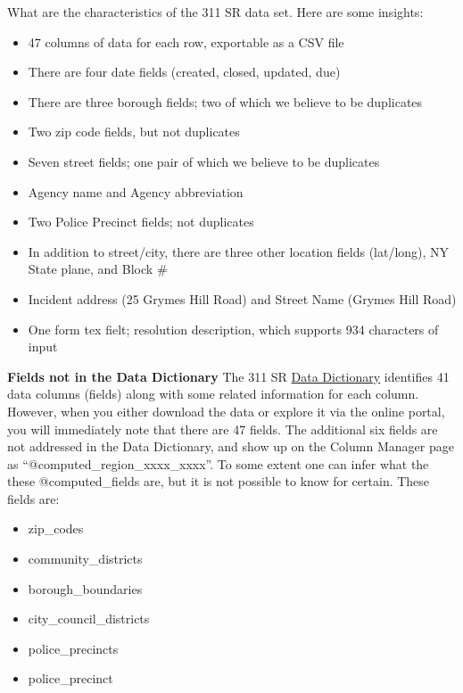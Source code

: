 \documentclass[12pt, titlepage]{article}
\begin{document}
What are the characteristics of the 311 SR data set. Here are some insights:

\begin{itemize}
	\item 47 columns of data for each row, exportable as a CSV file
	\item There are four date fields (created, closed, updated, due)
	\item There are three borough fields; two of which we believe to be duplicates
	\item Two zip code fields, but not duplicates
	\item Seven street fields; one pair of which we believe to be duplicates
	\item Agency name and Agency abbreviation
	\item Two Police Precinct fields; not duplicates
	\item In addition to street/city, there are three other location fields (lat/long), NY State plane, and Block \#
	\item Incident address (25 Grymes Hill Road) and Street Name (Grymes Hill Road)
	\item One form tex fielt; resolution description, which supports 934 characters of input
\end{itemize}


\textbf{Fields not in the Data Dictionary} The 311 SR \href{https://data.cityofnewyork.us/api/views/erm2-nwe9/files/b372b884-f86a-453b-ba16-1fe06ce9d212?download=true&filename=311_ServiceRequest_2010-Present_DataDictionary_Updated_2023.xlsx}{Data Dictionary}
 identifies 41 data columns (fields) along with some
related information for each column. However, when you either download the data or explore it via the online portal,
you will immediately note that there are 47 fields. The additional six fields are not addressed in the Data Dictionary, and show up on the Column Manager
page as ``@computed\_region\_xxxx\_xxxx''. To some extent one can infer what the these @computed\_fields are, but it is not possible to know
for certain. These fields are:
\begin{itemize}
	\item zip\_codes
	\item community\_districts
	\item borough\_boundaries
	\item city\_council\_districts
	\item police\_precincts
	\item police\_precinct 
\end{itemize}	
\end{document}
